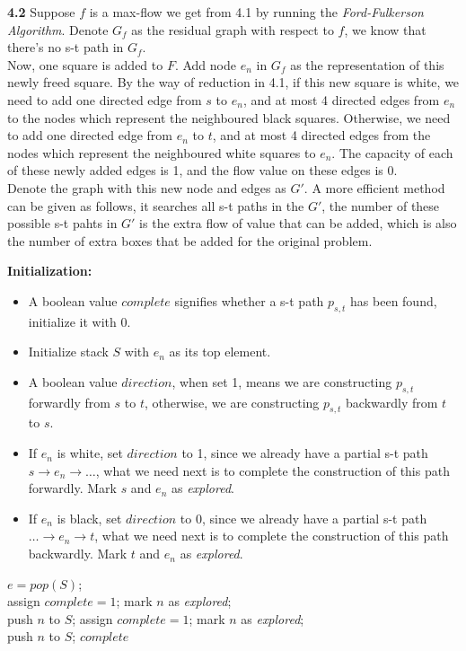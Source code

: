 \documentclass[10pt]{article}
\begin{document}
\textbf{4.2} {\color{red}Suppose $f$ is a max-flow we get from 4.1 by running the \emph{Ford-Fulkerson Algorithm}. Denote $G_f$ as the residual graph with respect to $f$, we know that there's no s-t path in $G_f$.\\
Now, one square is added to $F$. Add node $e_n$ in $G_f$ as the representation of this newly freed square. By the way of reduction in 4.1, if this new square is white, we need to add one directed edge from $s$ to $e_n$, and at most 4 directed edges from $e_n$ to the nodes which represent the neighboured black squares. Otherwise, we need to add one directed edge from $e_n$ to $t$, and at most 4 directed edges from the nodes which represent the neighboured white squares to $e_n$. The capacity of each of these newly added edges is 1, and the flow value on these edges is 0.\\
Denote the graph with this new node and edges as $G'$. A more efficient method can be given as follows, it searches all s-t paths in the $G'$, the number of these possible s-t pahts in $G'$ is the extra flow of value that can be added, which is also the number of extra boxes that be added for the original problem.
}
\begin{algorithmic}
\STATE \textbf{Initialization:}\\
\begin{itemize}
	\item A boolean value $complete$ signifies whether a  s-t path $p_{s,t}$ has been found, initialize it with 0.
	\item Initialize stack $S$ with $e_n$ as its top element. 
	\item A boolean value $direction$, when set 1, means we are constructing $p_{s,t}$ forwardly from $s$ to $t$, otherwise, we are constructing $p_{s,t}$ backwardly from $t$ to $s$.
	\item If $e_n$ is white, set $direction$ to 1, since we already have a partial s-t path $s \to e_n \to \dots$, what we need next is to complete the construction of this path forwardly. Mark $s$ and $e_n$ as \emph{explored}.
	\item If $e_n$ is black, set $direction$ to 0, since we already have a partial s-t path $\dots \to e_n \to t$, what we need next is to complete the construction of this path backwardly. Mark $t$ and $e_n$ as \emph{explored}.
\end{itemize}
\STATE $e =  pop(S)$;\\
	\STATE assign $complete = 1$;
	\ELSE
		\STATE mark $n$ as \emph{explored};\\ push $n$ to $S$;
		\ENDFOR
	\ENDIF
\ELSE
	\STATE assign $complete = 1$;
	\ELSE
		\STATE mark $n$ as \emph{explored};\\ push $n$ to $S$;
		\ENDFOR
	\ENDIF
\ENDIF
\ENDWHILE
\RETURN $complete$
 \end{algorithmic}
\end{document}
